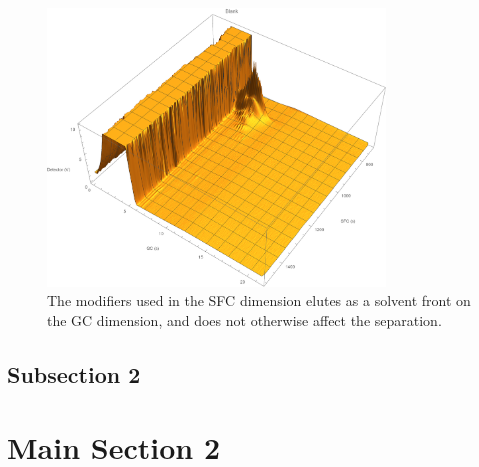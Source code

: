 \begin{figure}
	\centering
	\includegraphics[width=0.8\textwidth]{Figures/Modifier.pdf}
	\decoRule	
	
	\caption[Modifiers in SFC]{The modifiers used in the SFC dimension elutes as a
solvent front on the GC dimension, and does not otherwise affect the separation.}
	
	\label{fig:Modifier} 
\end{figure}

\subsection{Subsection 2}


\section{Main Section 2}
